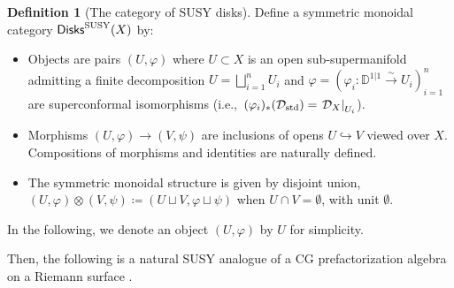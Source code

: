 \documentclass[final,reqno]{amsart}
\numberwithin{equation}{section}
\theoremstyle{definition}
\newtheorem{dfn}[thm]{Definition}
\newcommand{\ceq}{\coloneqq} %
\newcommand{\xr}{\xrightarrow}
\newcommand{\inj}{\hookrightarrow}
\newcommand{\lto}{\longrightarrow}
\newcommand{\sto}{\xr{\sim}}
\newcommand{\std}{\textup{std}}
\newcommand{\SUSY}{\textup{SUSY}}
\newcommand{\sD}{\mathbb{D}^{1|1}}
\newcommand{\clD}{\mathcal{D}}
\newcommand{\sfC}{\mathsf{C}}
\newcommand{\rst}[2]{\left. #1 \right|_{#2}}
\DeclareMathOperator{\bbD}{\mathbb{D}}
\DeclareMathOperator{\Obs}{Obs}
\DeclareMathOperator{\Disk}{\mathsf{Disks}}
\begin{document}
\begin{dfn}[{The category of SUSY disks}]
Define a symmetric monoidal category $\Disk^{\SUSY}(X)$ by: 
\begin{itemize}
\item 
Objects are pairs $(U,\varphi)$ where $U\subset X$ is an open sub-supermanifold
admitting a finite decomposition $U=\bigsqcup_{i=1}^n U_i$ and
$\varphi = (\varphi_i\colon \sD \sto U_i)_{i=1}^n$ 
are superconformal isomorphisms 
(i.e.,\ $(\varphi_i)_*(\clD_{\std})=\rst{\clD_X}{U_i}$).

\item 
Morphisms $(U,\varphi) \to (V,\psi)$ are 
inclusions of opens $U \inj V$ viewed over $X$.
Compositions of morphisms and identities are naturally defined.

\item
The symmetric monoidal structure is given by disjoint union, 
$(U,\varphi) \otimes (V,\psi) \ceq (U \sqcup V,\varphi\sqcup\psi)$ 
when $U\cap V=\emptyset$, with unit $\emptyset$.
\end{itemize}
In the following, we denote an object $(U,\varphi)$ by $U$ for simplicity.
\end{dfn}

%
%
%

Then, the following is a natural SUSY analogue of 
a CG prefactorization algebra on a Riemann surface \cite[\S3.1, \S5.1]{CG1}.

\end{document}
